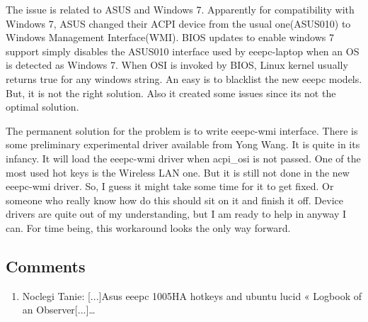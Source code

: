 The issue is related to ASUS and Windows 7. Apparently for compatibility with Windows 7, ASUS changed their ACPI device from the usual one(ASUS010) to Windows Management Interface(WMI). BIOS updates to enable windows 7 support simply disables the ASUS010 interface used by eeepc-laptop when an OS is detected as Windows 7. When OSI is invoked by BIOS, Linux kernel usually returns true for any windows string. An easy is to blacklist the new eeepc models. But, it is not the right solution. Also it created some issues since its not the optimal solution.

The permanent solution for the problem is to write eeepc-wmi interface. There is some preliminary experimental driver available from Yong Wang. It is quite in its infancy. It will load the eeepc-wmi driver when acpi_osi is not passed. One of the most used hot keys is the Wireless LAN one. But it is still not done in the new eeepc-wmi driver. So, I guess it might take some time for it to get fixed. Or someone who really know how do this should sit on it and finish it off. Device drivers are quite out of my understanding, but I am ready to help in anyway I can. For time being, this workaround looks the only way forward.

\subsection{Comments}
\begin{enumerate}
 \item Noclegi Tanie: 
[...]Asus eeepc 1005HA hotkeys and ubuntu lucid « Logbook of an Observer[...]…
\end{enumerate}

\newpage 